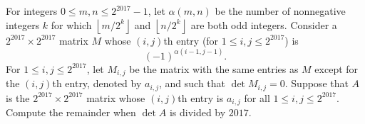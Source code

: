 For integers $0 \le m,n \le 2^{2017}-1$, let $\alpha(m,n)$ be the number of nonnegative integers $k$ for which $\left\lfloor m/2^k \right\rfloor$ and $\left\lfloor n/2^k \right\rfloor$ are both odd integers.  Consider a $2^{2017} \times 2^{2017}$ matrix $M$ whose $(i,j)$th entry (for $1 \le i, j \le 2^{2017}$) is \[ (-1)^{\alpha(i-1, j-1)}. \] For $1 \le i, j \le 2^{2017}$, let $M_{i,j}$ be the matrix with the same entries as $M$ except for the $(i,j)$th entry, denoted by $a_{i,j}$, and such that $\det M_{i,j}=0$. Suppose that $A$ is the $2^{2017} \times 2^{2017}$ matrix whose $(i,j)$th entry is $a_{i,j}$ for all $1 \le i, j \le 2^{2017}$. Compute the remainder when $\det A$ is divided by $2017$.
